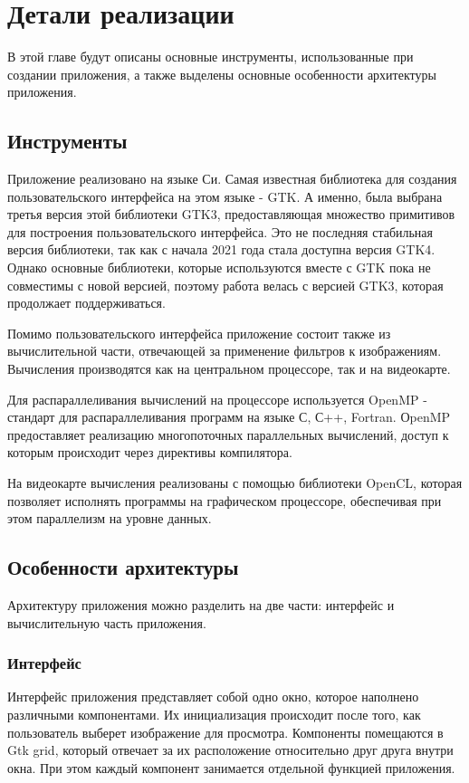 \section{Детали реализации}
В этой главе будут описаны основные инструменты, использованные при создании приложения, а также выделены основные особенности 
архитектуры приложения.

\subsection{Инструменты}
Приложение реализовано на языке Си. Самая известная библиотека для создания пользовательского интерфейса на этом языке - GTK. 
А именно, была выбрана третья версия этой библиотеки GTK3\cite{gtk3}, предоставляющая множество примитивов для построения 
пользовательского интерфейса. Это не последняя стабильная версия библиотеки, так как с начала 2021 года стала доступна версия GTK4. 
Однако основные библиотеки, которые используются вместе с GTK пока не совместимы с новой версией, поэтому работа велась с версией GTK3, 
которая продолжает поддерживаться.

Помимо пользовательского интерфейса приложение состоит также из вычислительной части, отвечающей за применение фильтров к изображениям. 
Вычисления производятся как на центральном процессоре, так и на видеокарте.

Для распараллеливания вычислений на процессоре используется OpenMP\cite{openmp} - стандарт для распараллеливания программ на языке С, 
С++, Fortran. ОpenMP предоставляет реализацию многопоточных параллельных вычислений, доступ к которым происходит через директивы компилятора.

На видеокарте вычисления реализованы с помощью библиотеки OpenCL\cite{opencl}, которая позволяет исполнять программы на графическом 
процессоре, обеспечивая при этом параллелизм на уровне данных.

\subsection{Особенности архитектуры}
Архитектуру приложения можно разделить на две части: интерфейс и вычислительную часть приложения.

\subsubsection{Интерфейс}
Интерфейс приложения представляет собой одно окно, которое наполнено различными компонентами. Их инициализация происходит после того, 
как пользователь выберет изображение для просмотра. Компоненты помещаются в Gtk grid, который отвечает за их расположение относительно 
друг друга внутри окна. При этом каждый компонент занимается отдельной функцией приложения.

